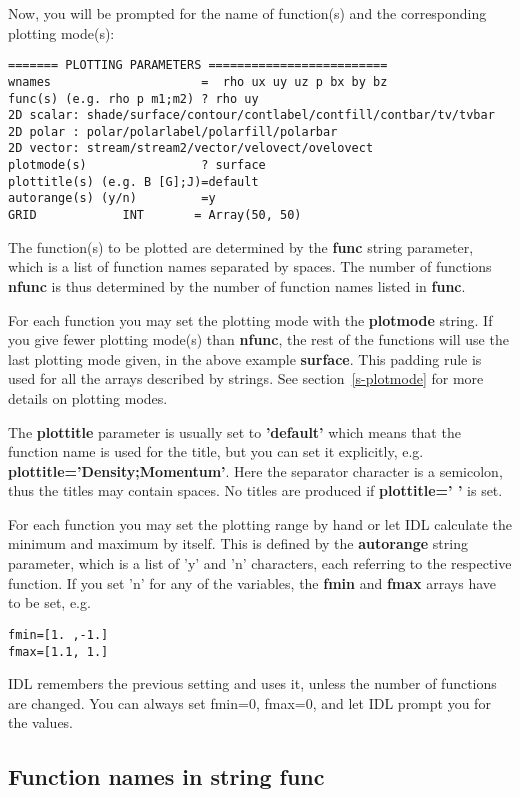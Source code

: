 \documentclass{article}
\begin{document}
   Now, you will be prompted 
   for the name of function(s) and the corresponding plotting mode(s):
\begin{verbatim}
======= PLOTTING PARAMETERS =========================
wnames                     =  rho ux uy uz p bx by bz
func(s) (e.g. rho p m1;m2) ? rho uy
2D scalar: shade/surface/contour/contlabel/contfill/contbar/tv/tvbar
2D polar : polar/polarlabel/polarfill/polarbar
2D vector: stream/stream2/vector/velovect/ovelovect
plotmode(s)                ? surface
plottitle(s) (e.g. B [G];J)=default
autorange(s) (y/n)         =y
GRID            INT       = Array(50, 50)
\end{verbatim}
   The function(s) to be plotted are determined by the {\bf func}
   string parameter, which is a list of function names separated by spaces.
   The number of functions {\bf nfunc} is thus determined by the number of
   function names listed in {\bf func}. 

   For each function you may set the plotting mode with the {\bf plotmode} string.
   If you give fewer plotting mode(s) than {\bf nfunc}, the rest of
   the functions will use the last plotting mode given, in the above example
   {\bf surface}. This padding rule is used for all the arrays described 
   by strings. See section~\ref{s-plotmode} for more details on plotting modes.

   The {\bf plottitle} parameter is usually set to {\bf 'default'} which
   means that the function name is used for the title, but you can set it
   explicitly, e.g. {\bf plottitle='Density;Momentum'}. Here the 
   separator character is a semicolon, thus the titles may contain spaces.
   No titles are produced if {\bf plottitle=' '} is set.

   For each function you may set the plotting range by hand or let IDL
   calculate the minimum and maximum by itself. This is defined by
   the {\bf autorange} string parameter, which is a list of 'y' and 'n'
   characters, each referring to the respective function. If you set 'n'
   for any of the variables, the {\bf fmin} and {\bf fmax} arrays have
   to be set, e.g.
\begin{verbatim}
fmin=[1. ,-1.]
fmax=[1.1, 1.]
\end{verbatim}
   IDL remembers the previous setting and uses it, unless the number
   of functions are changed. You can always set fmin=0, fmax=0, and let
   IDL prompt you for the values.

\subsection{Function names in string func \label{s-functions}}
\end{document}
